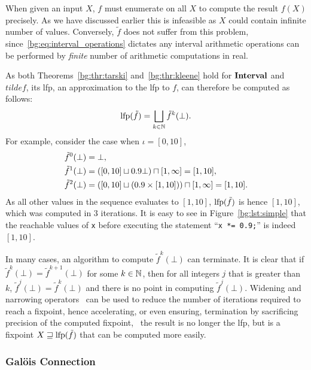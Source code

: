 When given an input $X$, $f$ must enumerate on all $X$ to compute the result
$f(X)$ precisely.  As we have discussed earlier this is infeasible as $X$
could contain infinite number of values.  Conversely, $\tilde{f}$ does not
suffer from this problem, since~\eqref{bg:eq:interval_operations} dictates any
interval arithmetic operations can be performed by \emph{finite} number of
arithmetic computations in real.

As both Theorems~\ref{bg:thr:tarski} and~\ref{bg:thr:kleene} hold for
$\mathbf{Interval}$ and $tilde{f}$, its \gls{lfp}, an approximation to the \gls{lfp}
to $f$, can therefore be computed as follows:
\begin{equation}
    \operatorname{\mathrm{lfp}} (\tilde{f}) = \bigsqcup_{k \in \mathbb{N}} \tilde{f}^k (\bot).
\end{equation}
For example, consider the case when $\iota = [0, 10]$,
\begin{equation}
    \begin{aligned}
        \tilde{f}^0 (\bot) &= \bot, \\
        \tilde{f}^1 (\bot) &= \left(
                [0, 10] \sqcup 0.9 \bot
            \right) \sqcap [1, \infty] = [1, 10], \\
        \tilde{f}^2 (\bot) &= \left(
                [0, 10] \sqcup \left( 0.9 \times [1, 10] \right)
            \right) \sqcap [1, \infty] = [1, 10].
    \end{aligned}
\end{equation}
As all other values in the sequence evaluates to $[1, 10]$, $\operatorname{\mathrm{lfp}}(\tilde{f})$
is hence $[1, 10]$, which was computed in 3 iterations.  It is easy to see
in Figure~\ref{bg:lst:simple} that the reachable values of \verb|x| before
executing the statement ``\verb|x *= 0.9;|'' is indeed $[1, 10]$.

In many cases, an algorithm to compute $\tilde{f}^k(\bot)$ can terminate.
It is clear that if $\tilde{f}^k(\bot) = \tilde{f}^{k+1}(\bot)$ for some
$k \in \mathbb{N}$, then for all integers $j$ that is greater than $k$,
$\tilde{f}^{j}(\bot) = \tilde{f}^{k}(\bot)$ and there is no point in computing
$\tilde{f}^{j}(\bot)$.  Widening and narrowing operators~\cite{cousot77,
nielson99} can be used to reduce the number of iterations required to reach
a fixpoint, hence accelerating, or even ensuring, termination by sacrificing
precision of the computed fixpoint, \ie~the result is no longer the \gls{lfp},
but is a fixpoint $X \sqsupseteq \operatorname{\mathrm{lfp}}(\tilde{f})$ that can be computed more
easily.

\subsubsection{Gal\"ois Connection}
\label{bg:ssub:galois}

